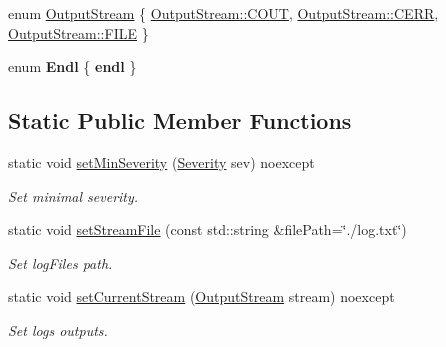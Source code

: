 \begin{DoxyCompactItemize}
enum \mbox{\hyperlink{classZiApi_1_1ZiLogger_a0c544845c83a82d59454407e154634c2}{Output\+Stream}} \{ \mbox{\hyperlink{classZiApi_1_1ZiLogger_a0c544845c83a82d59454407e154634c2a5822f620df7e1c3829eabe17ea69afbf}{Output\+Stream\+::\+C\+O\+UT}}, 
\mbox{\hyperlink{classZiApi_1_1ZiLogger_a0c544845c83a82d59454407e154634c2ac3d976eb96cea3825a4e403d164e50d4}{Output\+Stream\+::\+C\+E\+RR}}, 
\mbox{\hyperlink{classZiApi_1_1ZiLogger_a0c544845c83a82d59454407e154634c2a9fc5887c030f7a3e19821ebec457e719}{Output\+Stream\+::\+F\+I\+LE}}
 \}
\item 
\mbox{\label{classZiApi_1_1ZiLogger_a622fde9aa8b9f9e178b5e6c5f84aa273}} 
enum {\bfseries Endl} \{ {\bfseries endl}
 \}
\end{DoxyCompactItemize}
\subsection*{Static Public Member Functions}
\begin{DoxyCompactItemize}
\item 
static void \mbox{\hyperlink{classZiApi_1_1ZiLogger_a218a9e2df01c0984b4f9721e977dbb75}{set\+Min\+Severity}} (\mbox{\hyperlink{classZiApi_1_1ZiLogger_a483a2cb1e6000a67acba1c903f780225}{Severity}} sev) noexcept
\begin{DoxyCompactList}\small\item\em Set minimal severity. \end{DoxyCompactList}\item 
static void \mbox{\hyperlink{classZiApi_1_1ZiLogger_a38ec94a0c7bbcb8ffbb0b76bd255c748}{set\+Stream\+File}} (const std\+::string \&file\+Path=\char`\"{}./log.\+txt\char`\"{})
\begin{DoxyCompactList}\small\item\em Set log\+File\textquotesingle{}s path. \end{DoxyCompactList}\item 
static void \mbox{\hyperlink{classZiApi_1_1ZiLogger_a210348e6fe7c30a1f52a2bd9414b0f66}{set\+Current\+Stream}} (\mbox{\hyperlink{classZiApi_1_1ZiLogger_a0c544845c83a82d59454407e154634c2}{Output\+Stream}} stream) noexcept
\begin{DoxyCompactList}\small\item\em Set logs outputs. \end{DoxyCompactList}\end{DoxyCompactItemize}
